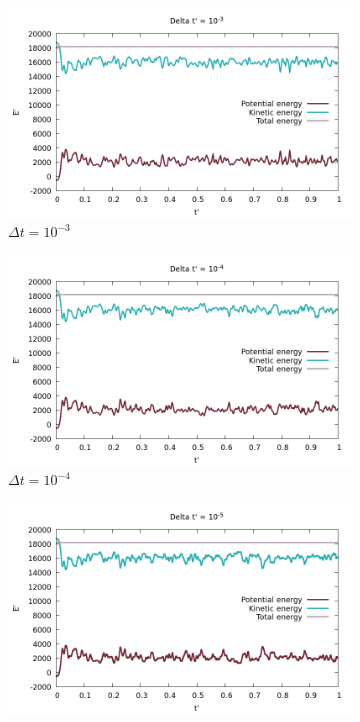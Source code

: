 \documentclass[a4paper,10pt]{article}
\begin{document}
\begin{figure}
	\centering
	\begin{subfigure}{0.45\linewidth}
		\includegraphics[width=\linewidth]{energy_verlet_1}
		\caption{$\Delta t = 10^{-3}$}
		\label{fig:energyverlet1}
	\end{subfigure}
	\begin{subfigure}{0.45\linewidth}
		\includegraphics[width=\linewidth]{energy_verlet_2}
		\caption{$\Delta t = 10^{-4}$}
		\label{fig:energyverlet2}
	\end{subfigure}
	\begin{subfigure}{0.45\linewidth}
		\includegraphics[width=\linewidth]{energy_verlet_3} 

\end{subfigure}
\end{figure}
\end{document}
